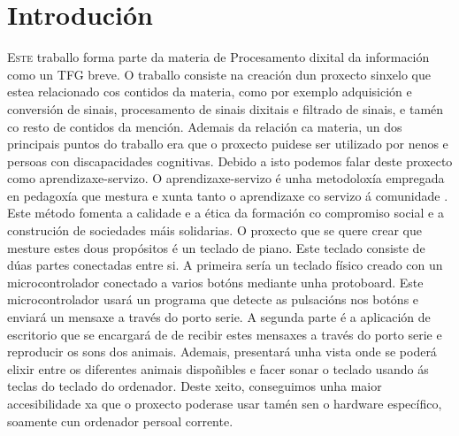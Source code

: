 \chapter{Introdución}
\label{chap:introducion}

\lettrine{E}{ste} traballo forma parte da materia de Procesamento dixital da información como un TFG breve. O traballo consiste na creación dun proxecto sinxelo que estea relacionado cos contidos da materia, como por exemplo adquisición e conversión de sinais, procesamento de sinais dixitais e filtrado de sinais, e tamén co resto de contidos da mención. Ademais da relación ca materia, un dos principais puntos do traballo era que o proxecto puidese ser utilizado por nenos e persoas con discapacidades cognitivas. Debido a isto podemos falar deste proxecto como aprendizaxe-servizo.
\newline\newline
O aprendizaxe-servizo é unha metodoloxía empregada en pedagoxía que mestura e xunta tanto o aprendizaxe co servizo á comunidade \cite{AprendizaxeServizo}. Este método fomenta a calidade e a ética da formación co compromiso social e a construción de sociedades máis solidarias.
\newline\newline
O proxecto que se quere crear que mesture estes dous propósitos é un teclado de piano. Este teclado consiste de dúas partes conectadas entre si. A primeira sería un teclado físico creado con un microcontrolador conectado a varios botóns mediante unha protoboard. Este microcontrolador usará un programa que detecte as pulsacións nos botóns e enviará un mensaxe a través do porto serie. A segunda parte é a aplicación de escritorio que se encargará de de recibir estes mensaxes a través do porto serie e reproducir os sons dos animais. Ademais, presentará unha vista onde se poderá elixir entre os diferentes animais dispoñibles e facer sonar o teclado usando ás teclas do teclado do ordenador. Deste xeito, conseguimos unha maior accesibilidade xa que o proxecto poderase usar tamén sen o hardware específico, soamente cun ordenador persoal corrente.
\newline\newline

